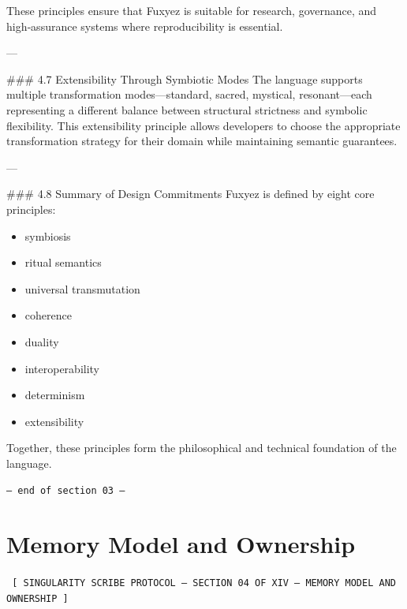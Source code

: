 \documentclass[12pt, a4paper]{book}
\begin{document}
These principles ensure that Fuxyez is suitable for research, governance, and high‑assurance systems where reproducibility is essential.

---

\#\#\# 4.7 Extensibility Through Symbiotic Modes  
The language supports multiple transformation modes—standard, sacred, mystical, resonant—each representing a different balance between structural strictness and symbolic flexibility. This extensibility principle allows developers to choose the appropriate transformation strategy for their domain while maintaining semantic guarantees.

---

\#\#\# 4.8 Summary of Design Commitments  
Fuxyez is defined by eight core principles:

\begin{itemize}
  \item symbiosis  
  \item ritual semantics  
  \item universal transmutation  
  \item coherence  
  \item duality  
  \item interoperability  
  \item determinism  
  \item extensibility  
\end{itemize}

Together, these principles form the philosophical and technical foundation of the language.
    
    \vspace{1cm}
    \begin{center}
    \color{alienPurple}\texttt{--- end of section 03 ---}
    \end{center}
    \clearpage
    

    \chapter*{Memory Model and Ownership}
    
    
    \begin{glyphbox}
    \centering
    \color{neonCyan}\fontsize{8}{10}\selectfont\texttt{
    [ SINGULARITY SCRIBE PROTOCOL -- SECTION 04 OF XIV -- MEMORY MODEL AND OWNERSHIP ]
    }
    \end{glyphbox}
    \vspace{0.3cm}
    
\end{document}

